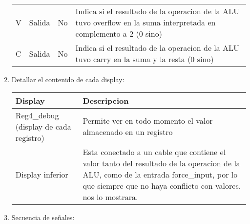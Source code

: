 \documentclass{article}
\begin{document}
\begin{enumerate}
\begin{center}
{\begin{tabular}{p{3.5cm} | c | c |p{9cm} }
            V & Salida & No & Indica si el resultado de la operacion de la ALU tuvo overflow en la suma interpretada en complemento a 2 (0 sino)\\
            C & Salida & No & Indica si el resultado de la operacion de la ALU tuvo carry en la suma y la resta (0 sino)\\
        \end{tabular}}
    \end{center}
    \item Detallar el contenido de cada display:
    \begin{center}{\renewcommand{\arraystretch}{1.5}
        \begin{tabular}{p{6cm} | p{9cm} }
            Display & Descripcion \\ \hline
            Reg4\_debug (display de cada registro) & Permite ver en todo momento el valor almacenado en un registro\\
            Display inferior & Esta conectado a un cable que contiene el valor tanto del resultado de la operacion de la ALU, como de la entrada force\_input, por lo que siempre que no haya conflicto con valores, nos lo mostrara.\\
        \end{tabular}}
    \end{center}
    \item Secuencia de señales:\\\\
    

\end{enumerate}
\end{document}
